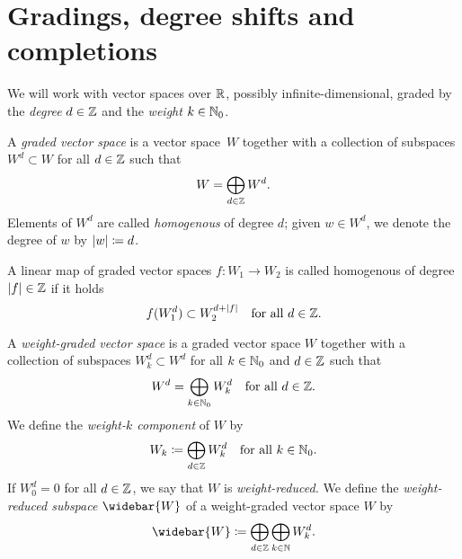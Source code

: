 \documentclass[\MainFolder/Text.tex]{subfiles}
\begin{document}
\section{Gradings, degree shifts and completions
}
\label{Sec:Alg1a}

We will work with vector spaces over $\mathbb{R}$, possibly infinite-dimensional, graded by the \emph{degree} $d\in \mathbb{Z}$ and the \emph{weight} $k\in \mathbb{N}_0$.

\begin{Definition}\label{Def:Grading}
A \emph{graded vector space} is a vector space~$W$ together with a collection  of subspaces $W^d \subset W$ for all $d\in \mathbb{Z}$ such that
$$ W=\bigoplus_{d\in \mathbb{Z}} W^d. $$
Elements of $W^d$ are called \emph{homogenous} of degree $d$; given $w\in W^d$, we denote the degree of $w$ by $|w| \coloneqq d$. 

A linear map of graded vector spaces $f: W_1 \rightarrow W_2$ is called homogenous of degree $|f| \in \mathbb{Z}$ if it holds 
\begin{equation}\label{Eq:StdGrading}
f(W_1^d)\subset W_2^{d+|f|}\quad\text{for all }d\in \mathbb{Z}.
\end{equation}

A \emph{weight-graded vector space} is a graded vector space $W$ together with a collection of subspaces $W_k^d \subset W^d$ for all $k\in \mathbb{N}_0$ and $d\in \mathbb{Z}$ such that
$$ W^d=\bigoplus_{k\in\mathbb{N}_0} W_k^d\quad\text{for all }d\in \mathbb{Z}. $$
We define the \emph{weight-$k$ component} of $W$ by
$$ W_k \coloneqq \bigoplus_{d\in \mathbb{Z}} W_k^d\quad\text{for all }k\in \mathbb{N}_0. $$
If $W_0^d = 0$ for all $d\in \mathbb{Z}$, we say that $W$ is \emph{weight-reduced.} We define the \emph{weight-reduced subspace} $\widebar{W}$ of a weight-graded vector space $W$ by
$$ \widebar{W} \coloneqq \bigoplus_{d\in \Z} \bigoplus_{k\in\N} W_k^d. $$ 



\end{Definition}
\end{document}
